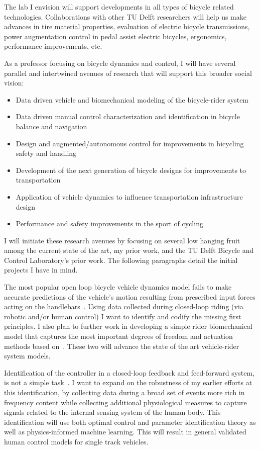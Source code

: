 \documentclass{article}
\begin{document}
The lab I envision will support developments in all types of bicycle related
technologies. Collaborations with other TU Delft researchers will help us make
advances in tire material properties, evaluation of electric bicycle
transmissions, power augmentation control in pedal assist electric bicycles,
ergonomics, performance improvements, etc.

As a professor focusing on bicycle dynamics and control, I will have several
parallel and intertwined avenues of research that will support this broader
social vision:
%
\begin{itemize}
  \setlength\itemsep{0.2em}
  \item Data driven vehicle and biomechanical modeling of the bicycle-rider
    system
  \item Data driven manual control characterization and identification in
    bicycle balance and navigation
  \item Design and augmented/autonomous control for improvements in bicycling
    safety and handling
  \item Development of the next generation of bicycle designs for improvements
    to transportation
  \item Application of vehicle dynamics to influence transportation
    infrastructure design
  \item Performance and safety improvements in the sport of cycling
\end{itemize}

I will initiate these research avenues by focusing on several low hanging fruit
among the current state of the art, my prior work, and the TU Delft Bicycle and
Control Laboratory's prior work. The following paragraphs detail the initial
projects I have in mind.

The most popular open loop bicycle vehicle dynamics model fails to make
accurate predictions of the vehicle's motion resulting from prescribed input
forces acting on the handlebars~\cite{Moore2013a}. Using data collected during
closed-loop riding (via robotic and/or human control) I want to identify and
codify the missing first principles. I also plan to further work in developing
a simple rider biomechanical model that captures the most important degrees of
freedom and actuation methods based on~\cite{Moore2011}. These two will advance
the state of the art vehicle-rider system models.

Identification of the controller in a closed-loop feedback and feed-forward
system, is not a simple task~\cite{vanderKooij2005}. I want to expand on the
robustness of my earlier efforts at this identification, by collecting data
during a broad set of events more rich in frequency content while collecting
additional physiological measures to capture signals related to the internal
sensing system of the human body. This identification will use both optimal
control and parameter identification theory as well as physics-informed machine
learning. This will result in general validated human control models for single
track vehicles.
\end{document}
